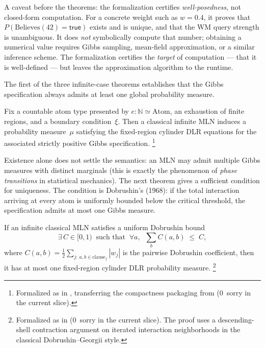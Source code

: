 \documentclass[11pt,openany]{report}
\begin{document}
A caveat before the theorems: the formalization certifies
\emph{well-posedness}, not closed-form computation.  For a concrete weight
such as $w=0.4$, it proves that $P(\mathrm{Believes}(42)=\mathsf{true})$
exists and is unique, and that the WM query strength is unambiguous.  It does
\emph{not} symbolically compute that number; obtaining a numerical value
requires Gibbs sampling, mean-field approximation, or a similar inference
scheme.  The formalization certifies the \emph{target} of computation --- that
it is well-defined --- but leaves the approximation algorithm to the runtime.

\medskip
\noindent
The first of the three infinite-case theorems establishes that the Gibbs
specification always admits at least one global probability measure.

\begin{theorem}
\label{thm:infinite-mln-existence}
Fix a countable atom type presented by $e : \mathbb{N} \simeq \mathrm{Atom}$,
an exhaustion of finite regions, and a boundary condition~$\xi$.  Then a
classical infinite MLN induces a probability measure~$\mu$ satisfying the
fixed-region cylinder DLR equations for the associated strictly positive Gibbs
specification.%
\footnote{Formalized as
 in
,
transferring the compactness packaging from
(0~sorry in the current slice).}
\end{theorem}

\noindent
Existence alone does not settle the semantics: an MLN may admit multiple
Gibbs measures with distinct marginals (this is exactly the phenomenon of
\emph{phase transitions} in statistical mechanics).  The next theorem gives a
sufficient condition for uniqueness.  The condition is Dobrushin's (1968):
if the total interaction arriving at every atom is uniformly bounded below the
critical threshold, the specification admits at most one Gibbs measure.

\begin{theorem}
\label{thm:infinite-mln-uniqueness}
If an infinite classical MLN satisfies a uniform Dobrushin bound
\[
  \exists\, C \in [0,1) \;\;\text{such that}\;\;
  \forall a,\;\;
  \sum_b C(a,b) \;\le\; C,
\]
where $C(a,b) = \tfrac{1}{2}\sum_{j:\,a,b\in\mathrm{clause}_j}|w_j|$ is the
pairwise Dobrushin coefficient, then it has at most one fixed-region cylinder
DLR probability measure.%
\footnote{Formalized as
in 
(0~sorry in the current slice).  The proof uses a descending-shell
contraction argument on iterated interaction neighborhoods in the classical
Dobrushin--Georgii style.}
\end{theorem}
\end{document}
